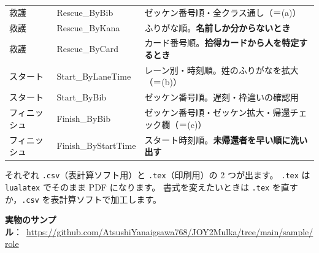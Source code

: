 \begin{J2M}
\begin{center}
\small
\begin{tabular}{@{}P{16mm}>{\ttfamily}P{34mm}P{74mm}@{}}
\toprule
{} & \rmfamily{} &  \\
\midrule
救護 & Rescue\_ByBib & ゼッケン番号順・全クラス通し（＝(a)） \\
救護 & Rescue\_ByKana & ふりがな順。\textbf{名前しか分からないとき} \\
救護 & Rescue\_ByCard & カード番号順。\textbf{拾得カードから人を特定するとき} \\
スタート & Start\_ByLaneTime & レーン別・時刻順。姓のふりがなを拡大（＝(b)） \\
スタート & Start\_ByBib & ゼッケン番号順。遅刻・枠違いの確認用 \\
フィニッシュ & Finish\_ByBib & ゼッケン番号順・ゼッケン拡大・帰還チェック欄（＝(c)） \\
フィニッシュ & Finish\_ByStartTime & スタート時刻順。\textbf{未帰還者を早い順に洗い出す} \\
\bottomrule
\end{tabular}
\end{center}

それぞれ \texttt{.csv}（表計算ソフト用）と \texttt{.tex}（印刷用）の 2 つが出ます。
\texttt{.tex} は \texttt{lualatex} でそのまま PDF になります。
書式を変えたいときは \texttt{.tex} を直すか，\texttt{.csv} を表計算ソフトで加工します。

\textbf{実物のサンプル}：\ \url{https://github.com/AtsushiYanaigsawa768/JOY2Mulka/tree/main/sample/role}
\end{J2M}


